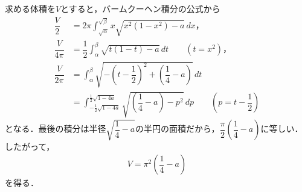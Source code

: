 \documentclass[../../main.tex]{subfiles}
\begin{document}
求める体積を$V$とすると，バームクーヘン積分の公式から
\begin{align}
  \dfrac{V}{2}
  &=2\pi\int_{\sqrt{\alpha}}^{\sqrt{\beta}}x\sqrt{x^2(1-x^2)-a}\,dx，\\
  \dfrac{V}{4\pi}
  &=\dfrac{1}{2}\int_\alpha^\beta\sqrt{t(1-t)-a}\,dt
  \qquad(t=x^2)，\\
  \dfrac{V}{2\pi}
  &=\int_\alpha^\beta\sqrt{-\left(t-\dfrac{1}{2}\right)^2+\left(\dfrac{1}{4}-a\right)}\,dt\\
  &=\int_{-\frac{1}{2}\sqrt{1-4a}}^{\frac{1}{2}\sqrt{1-4a}}
  \sqrt{\left(\dfrac{1}{4}-a\right)-p^2}\,dp
  \qquad\left(p=t-\dfrac{1}{2}\right)
\end{align}
となる．最後の積分は半径$\sqrt{\dfrac{1}{4}-a}$の半円の面積だから，$\dfrac{\pi}{2}\left(\dfrac{1}{4}-a\right)$に等しい．したがって，
\begin{align}
  V=\pi^2\left(\dfrac{1}{4}-a\right)
\end{align}
を得る．
\end{document}
